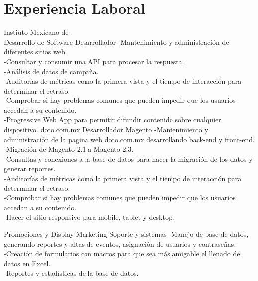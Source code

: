 \documentclass[%
	       doublesided,
	       paper=a4,
	       fontsize=10pt
	      ]{my-resume}
\begin{document}
{    \section[\faGears]{Experiencia Laboral}
	{Instiuto Mexicano de \\Desarrollo de Software}
	{Desarrollador}
	{
	    -Mantenimiento y administración de diferentes sitios web.\\ 
	    -Consultar y consumir una API para procesar la respuesta.\\ 
	    -Análisis de datos de campaña.\\
	    -Auditorías de métricas como la primera vista y el tiempo de interacción para determinar el retraso.\\ 
	    -Comprobar si hay problemas comunes que pueden impedir que los usuarios accedan a su contenido.\\
	    -Progressive Web App para permitir difundir contenido sobre cualquier dispositivo.
	    }
	{doto.com.mx}
	{Desarrollador Magento}
	{
	    -Mantenimiento y administración de la pagina web doto.com.mx desarrollando back-end y front-end.\\
	    -Migración de Magento 2.1 a Magento 2.3.\\
	    -Consultas y conexiones a la base de datos para hacer la migración de los datos y generar reportes.\\ 
	    -Auditorías de métricas como la primera vista y el tiempo de interacción para determinar el retraso.\\ 
	    -Comprobar si hay problemas comunes que pueden impedir que los usuarios accedan a su contenido.\\
	    -Hacer el sitio responsivo para mobile, tablet y desktop.
	}
    
	{Promociones y Display Marketing}
	{Soporte y sistemas}
	{
	    -Manejo de base de datos, generando reportes y altas de eventos, asignación de usuarios y contraseñas.\\
	    -Creación de formularios con macros para que sea más amigable el llenado de datos en Excel.\\
	    -Reportes y estadísticas de la base de datos.
	    }
}
\end{document}
